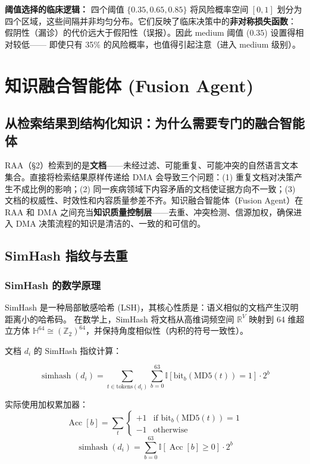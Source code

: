 \documentclass[11pt,a4paper]{ctexart}
\theoremstyle{remark}
\begin{document}
\textbf{阈值选择的临床逻辑：} 四个阈值 $\{0.35, 0.65, 0.85\}$ 将风险概率空间 $[0,1]$
划分为四个区域，这些间隔并非均匀分布。它们反映了临床决策中的\textbf{非对称损失函数}：
假阴性（漏诊）的代价远大于假阳性（误报）。因此 medium 阈值 ($0.35$) 设置得相对较低——
即使只有 35\% 的风险概率，也值得引起注意（进入 medium 级别）。

\section{知识融合智能体 (Fusion Agent)}

\subsection{从检索结果到结构化知识：为什么需要专门的融合智能体}

RAA（§2）检索到的是\textbf{文档}——未经过滤、可能重复、可能冲突的自然语言文本集合。直接将检索结果原样传递给 DMA 会导致三个问题：(1) 重复文档对决策产生不成比例的影响；(2) 同一疾病领域下内容矛盾的文档使证据方向不一致；(3) 文档的权威性、时效性和内容质量参差不齐。知识融合智能体（Fusion Agent）在 RAA 和 DMA 之间充当\textbf{知识质量控制层}——去重、冲突检测、信源加权，确保进入 DMA 决策流程的知识是清洁的、一致的和可信的。

\subsection{SimHash 指纹与去重}

\subsubsection{SimHash 的数学原理}

SimHash 是一种局部敏感哈希 (LSH)，其核心性质是：语义相似的文档产生汉明距离小的哈希码。
在数学上，SimHash 将文档从高维词频空间 $\mathbb{R}^{V}$ 映射到 64 维超立方体
$\mathbb{H}^{64} \cong (\mathbb{Z}_2)^{64}$，并保持角度相似性（内积的符号一致性）。

文档 $d_i$ 的 SimHash 指纹计算：

\begin{equation}
\operatorname{simhash}(d_i) = \sum_{t \in \text{tokens}(d_i)} \sum_{b=0}^{63} \mathbb{I}[\text{bit}_b(\text{MD5}(t)) = 1] \cdot 2^b
\end{equation}

实际使用加权累加器：
\begin{equation}
\operatorname{Acc}[b] = \sum_t \begin{cases} +1 & \text{if } \text{bit}_b(\text{MD5}(t)) = 1 \\ -1 & \text{otherwise} \end{cases}
\end{equation}
\begin{equation}
\operatorname{simhash}(d_i) = \sum_{b=0}^{63} \mathbb{I}[\operatorname{Acc}[b] \geq 0] \cdot 2^b
\end{equation}
\end{document}
